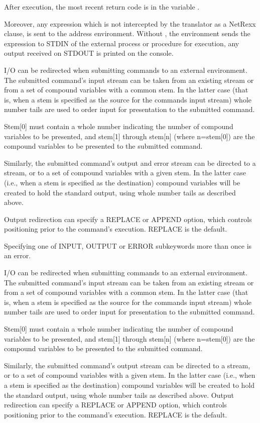 After execution, the most recent return code is in the variable .

Moreover, any expression which is not intercepted by the translator as a NetRexx clause, is sent to the address environment.
Without , the environment sends the expression to STDIN of the external process or procedure for execution, any output received on STDOUT is printed on the console.

I/O can be redirected when submitting commands to an external
environment. The submitted command's input stream can be taken from an
existing stream or from a set of compound variables with a common
stem. In the latter case (that is, when a stem is specified as the
source for the commands input stream) whole number tails are used to
order input for presentation to the submitted command.

Stem[0] must contain a whole number indicating the number of compound variables to be presented, and stem[1] through stem[n] (where n=stem[0]) are the compound variables to be presented to the submitted command.

Similarly, the submitted command's output and error stream can be directed to a stream, or to a set of compound variables with a given stem. In the latter case (i.e., when a stem is specified as the destination) compound variables will be created to hold the standard output, using whole number tails as described above. 

Output redirection can specify a REPLACE or APPEND option, which controls positioning prior to the command's execution. REPLACE is the default.

Specifying one of INPUT, OUTPUT or ERROR subkeywords more than once is an error.

I/O can be redirected when submitting commands to an external
environment. The submitted command's input stream can be taken from an
existing stream or from a set of compound variables with a common
stem. In the latter case (that is, when a stem is specified as the
source for the commands input stream) whole number tails are used to
order input for presentation to the submitted command.

Stem[0] must contain a whole number indicating the number of compound variables to be presented, and stem[1] through stem[n] (where n=stem[0]) are the compound variables to be presented to the submitted command.

Similarly, the submitted command's output stream can be directed to a stream, or to a set of compound variables with a given stem. In the latter case (i.e., when a stem is specified as the destination) compound variables will be created to hold the standard output, using whole number tails as described above. Output redirection can specify a REPLACE or APPEND option, which controls positioning prior to the command's execution. REPLACE is the default.

